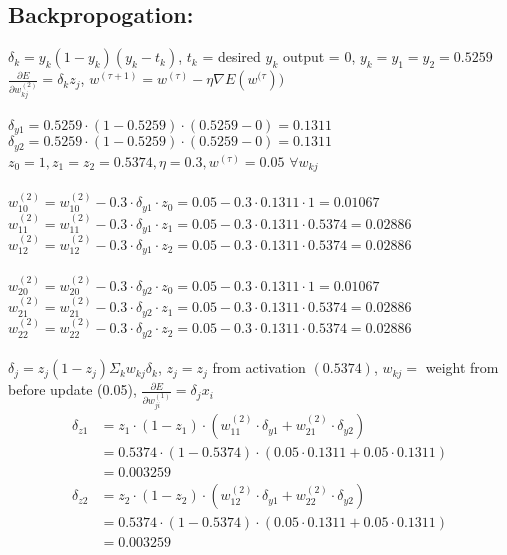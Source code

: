 \documentclass[letterpaper,notitlepage,twoside, fleqn]{article}
\begin{document}
   \subsection*{Backpropogation:}
   $\delta_k = y_k (1-y_k)(y_k - t_k)$, $t_k$ = desired $y_k$ output = 0, $y_k = y_1 = y_2 = 0.5259$ \\
   $ \frac{\partial E}{\partial w_{kj}^{(2)}} = \delta_k z_j$, $w^{(\tau + 1)} = w^{(\tau)} - \eta \nabla E(w^{(\tau}))$ \\\\
   $\delta_{y1} = 0.5259 \cdot (1 - 0.5259) \cdot (0.5259 - 0) = 0.1311$ \\
   $\delta_{y2} = 0.5259 \cdot (1 - 0.5259) \cdot (0.5259 - 0) = 0.1311$ \\
   $z_0 = 1, z_1 = z_2 = 0.5374, \eta = 0.3, w^{(\tau)} = 0.05$  $\forall w_{kj}$ \\\\
   $w^{(2)}_{10} = w^{(2)}_{10} - 0.3 \cdot \delta_{y1} \cdot z_0 = 0.05 - 0.3 \cdot 0.1311 \cdot 1 = 0.01067$ \\
   $w^{(2)}_{11} = w^{(2)}_{11} - 0.3 \cdot \delta_{y1} \cdot z_1 = 0.05 -0.3 \cdot 0.1311 \cdot 0.5374=0.02886$ \\
   $w^{(2)} _{12} = w^{(2)}_{12} - 0.3 \cdot \delta_{y1} \cdot z_2 = 0.05 -0.3 \cdot 0.1311 \cdot 0.5374=0.02886$\\\\
   $w^{(2)}_{20} = w^{(2)}_{20} - 0.3 \cdot \delta_{y2} \cdot z_0 = 0.05 - 0.3 \cdot 0.1311 \cdot 1 = 0.01067$ \\
   $w^{(2)}_{21} = w^{(2)}_{21} - 0.3 \cdot \delta_{y2} \cdot z_1 = 0.05 -0.3 \cdot 0.1311 \cdot 0.5374=0.02886$ \\
   $w^{(2)}_{22} = w^{(2)}_{22} - 0.3 \cdot \delta_{y2} \cdot z_2 = 0.05 -0.3 \cdot 0.1311 \cdot 0.5374=0.02886$ \\
   \\
   $\delta_j = z_j(1-z_j) \Sigma_k w_{kj} \delta_k$, $z_j = z_j$ from activation $(0.5374)$, $w_{kj} =$ weight from before update (0.05), $\frac{\partial E}{\partial w_{ji}^{(1)}} = \delta_j x_i$
   \begin{align*}
   \delta_{z1} &= z_1 \cdot (1-z_1) \cdot (w^{(2)}_{11} \cdot \delta_{y1} + w^{(2)}_{21} \cdot \delta_{y2})\\
   &= 0.5374 \cdot (1 - 0.5374) \cdot (0.05 \cdot 0.1311 + 0.05 \cdot 0.1311) \\
   &= 0.003259
   \end{align*}
  \begin{align*}
   \delta_{z2} &= z_2 \cdot (1-z_2) \cdot (w^{(2)}_{12} \cdot \delta_{y1} + w^{(2)}_{22} \cdot \delta_{y2})\\
   &= 0.5374 \cdot (1 - 0.5374) \cdot (0.05 \cdot 0.1311 + 0.05 \cdot 0.1311) \\
   &= 0.003259
   \end{align*}
\end{document}
